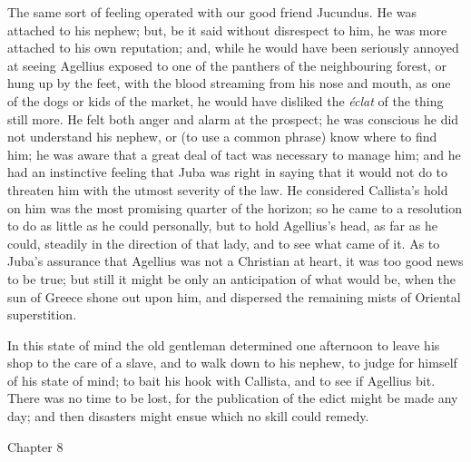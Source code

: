 The same sort of feeling operated with our good friend Jucundus. He
was attached to his nephew; but, be it said without disrespect to him,
he was more attached to his own reputation; and, while he would have
been seriously annoyed at seeing Agellius exposed to one of the
panthers of the neighbouring forest, or hung up by the feet, with the
blood streaming from his nose and mouth, as one of the dogs or kids of
the market, he would have disliked the \emph{éclat} of the thing
still more. He felt both anger and alarm at the prospect; he was
conscious he did not understand his nephew, or (to use a common
phrase) know where to find him; he was aware that a great deal of tact
was necessary to manage him; and he had an instinctive feeling that
Juba was right in saying that it would not do to threaten him with the
utmost severity of the law. He considered Callista's hold on him was
the most promising quarter of the horizon; so he came to a resolution
to do as little as he could personally, but to hold Agellius's head,
as far as he could, steadily in the direction of that lady, and to see
what came of it. As to Juba's assurance that Agellius was not a
Christian at heart, it was too good news to be true; but still it
might be only an anticipation of what would be, when the sun of Greece
shone out upon him, and dispersed the remaining mists of Oriental
superstition.

In this state of mind the old gentleman determined one
afternoon to leave his shop to the care of a slave, and to walk down
to his nephew, to judge for himself of his state of mind; to bait his
hook with Callista, and to see if Agellius bit. There was no time to
be lost, for the publication of the edict might be made any day; and
then disasters might ensue which no skill could remedy.

Chapter 8


